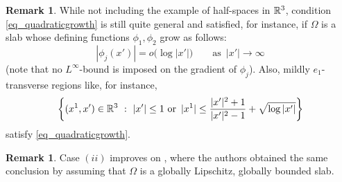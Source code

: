 \documentclass[10 pt,a4paper]{article}
\theoremstyle{definition}
\newtheorem{remark}[definition]{Remark}
\begin{document}

\begin{remark}
	While not including the example of half-spaces in $\mathbb R^3$, condition \eqref{eq_quadraticgrowth} is still quite general and satisfied, for instance, if $\Omega$ is a slab  whose defining functions $\phi_1,\phi_2$ grow as follows:
	\[
		|\phi_j(x')| = o\Big( \log |x'|\Big) \qquad \text{as } \, |x'| \to \infty
	\]
	(note that no $L^\infty$-bound is imposed on the gradient of $\phi_j$). Also, mildly $e_1$-transverse regions like, for instance,
	\[
		\left\{ (x^1,x')\in \mathbb R^3 \ : \ |x'|\le 1 \ \text{or } \, |x^1| \le \frac{|x'|^2 + 1}{|x'|^2 -1} + \sqrt{\log|x'|} \right\}
	\]
	satisfy \eqref{eq_quadraticgrowth}. 
\end{remark}

\begin{remark}
	Case $(ii)$ improves on \cite[Thm 1.3]{cmr}, where the authors obtained the same conclusion by assuming that $\Omega$ is a globally Lipschitz, globally bounded slab.
\end{remark}
\end{document}

